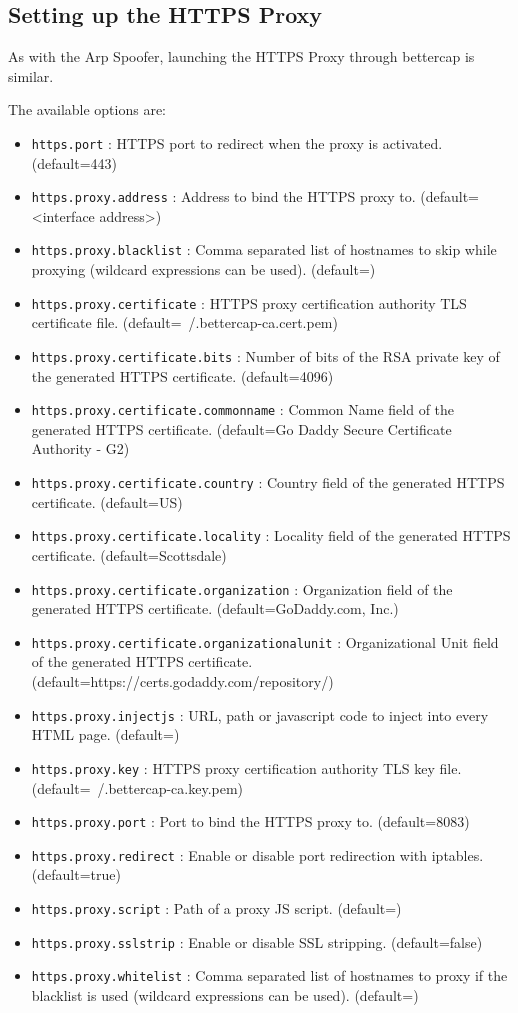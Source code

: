\subsection{Setting up the HTTPS Proxy}

As with the Arp Spoofer, launching the HTTPS Proxy through bettercap is similar.

The available options are:

\begin{itemize}
 \item \verb|https.port| : HTTPS port to redirect when the proxy is activated. (default=443)
 \item \verb|https.proxy.address| : Address to bind the HTTPS proxy to. (default=<interface address>)
 \item \verb|https.proxy.blacklist| : Comma separated list of hostnames to skip while proxying (wildcard expressions can be used). (default=)
 \item \verb|https.proxy.certificate| : HTTPS proxy certification authority TLS certificate file. (default=~/.bettercap-ca.cert.pem)
 \item \verb|https.proxy.certificate.bits| : Number of bits of the RSA private key of the generated HTTPS certificate. (default=4096)
 \item \verb|https.proxy.certificate.commonname| : Common Name field of the generated HTTPS certificate. (default=Go Daddy Secure Certificate Authority - G2)
 \item \verb|https.proxy.certificate.country| : Country field of the generated HTTPS certificate. (default=US)
 \item \verb|https.proxy.certificate.locality| : Locality field of the generated HTTPS certificate. (default=Scottsdale)
 \item \verb|https.proxy.certificate.organization| : Organization field of the generated HTTPS certificate. (default=GoDaddy.com, Inc.)
 \item \verb|https.proxy.certificate.organizationalunit| : Organizational Unit field of the generated HTTPS certificate. \newline(default=https://certs.godaddy.com/repository/)
 \item \verb|https.proxy.injectjs| : URL, path or javascript code to inject into every HTML page. (default=)
 \item \verb|https.proxy.key| : HTTPS proxy certification authority TLS key file. (default=~/.bettercap-ca.key.pem)
 \item \verb|https.proxy.port| : Port to bind the HTTPS proxy to. (default=8083)
 \item \verb|https.proxy.redirect| : Enable or disable port redirection with iptables. (default=true)
 \item \verb|https.proxy.script| : Path of a proxy JS script. (default=)
 \item \verb|https.proxy.sslstrip| : Enable or disable SSL stripping. (default=false)
 \item \verb|https.proxy.whitelist| : Comma separated list of hostnames to proxy if the blacklist is used (wildcard expressions can be used). (default=)
\end{itemize}

